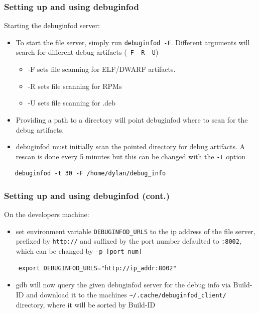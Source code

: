 \documentclass[12pt]{beamer}
\begin{document}
\begin{frame}[fragile]
   \fontsize{8pt}{10pt}{\selectfont}
   \frametitle{ Setting up and using debuginfod}
   Starting the debuginfod server:
   \begin{itemize}
      \item To start the file server, simply run \verb|debuginfod -F|. 
         Different arguments will search for different debug artifacts (\verb|-F -R -U|)
         \begin{itemize}
         \fontsize{8pt}{10pt}{\selectfont}
            \item -F sets file scanning for ELF/DWARF artifacts.
            \item -R sets file scanning for RPMs
            \item -U sets file scanning for .deb
         \end{itemize}
      \item Providing a path to a directory will point debuginfod where to scan for the debug artifacts.
      \item debuginfod must initially scan the pointed directory for debug artifacts. 
         A rescan is done every 5 minutes but this can be changed with the
         \color{gray}\verb|-t| \color{black} option
   \end{itemize}
   \vspace{-.5cm}
   \color{gray}
   \begin{verbatim}
   debuginfod -t 30 -F /home/dylan/debug_info
   \end{verbatim}
\end{frame}

\begin{frame}[fragile]
   \fontsize{10pt}{10pt}\selectfont
   \frametitle{ Setting up and using debuginfod (cont.)}
   On the developers machine:
   \begin{itemize}
      \item set environment variable \verb|DEBUGINFOD_URLS| to the ip address 
         of the file server, prefixed by \verb|http://| and suffixed by the 
         port number defaulted to \verb|:8002|, 
         which can be changed by \verb|-p [port num]|
   \end{itemize}
   \color{gray}
   \begin{verbatim}
    export DEBUGINFOD_URLS="http://ip_addr:8002"
    \end{verbatim}
    \begin{itemize}
       \item gdb will now query the given debuginfod server for the debug info 
          via Build-ID and download it to the machines \color{gray}
          \verb|~/.cache/debuginfod_client/| \color{black}
          directory, where it will be sorted by Build-ID
    \end{itemize}
    


\end{frame}
\end{document}
